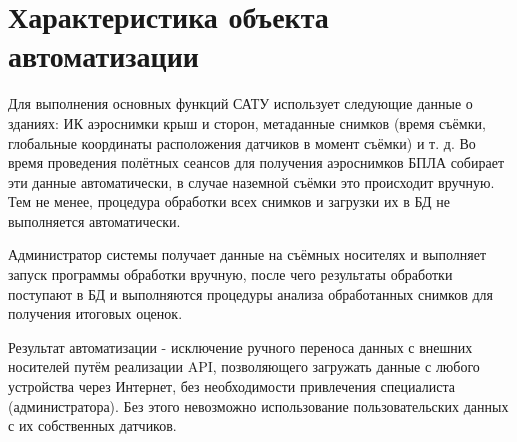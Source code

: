 \chapter{\enskip Характеристика объекта автоматизации}
	Для выполнения основных функций САТУ использует следующие данные о зданиях: ИК аэроснимки крыш и сторон, метаданные снимков (время съёмки, глобальные координаты расположения датчиков в момент съёмки) и т. д. Во время проведения полётных сеансов для получения аэроснимков БПЛА собирает эти данные автоматически, в случае наземной съёмки это происходит вручную. Тем не менее, процедура обработки всех снимков и загрузки их в БД не выполняется автоматически. 

	Администратор системы получает данные на съёмных носителях и выполняет запуск программы обработки вручную, после чего результаты обработки поступают в БД и выполняются процедуры анализа обработанных снимков для получения итоговых оценок.

	Результат автоматизации - исключение ручного переноса данных с внешних носителей путём реализации API, позволяющего загружать данные с любого устройства через Интернет, без необходимости привлечения специалиста (администратора). Без этого невозможно использование пользовательских данных с их собственных датчиков.


